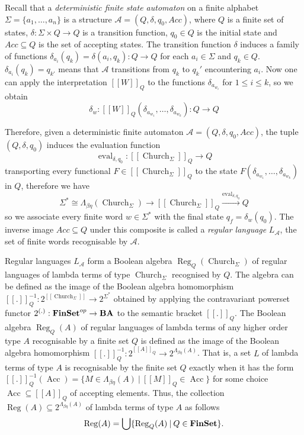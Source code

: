 \documentclass[8pt]{article}
\theoremstyle{definition}
\theoremstyle{definition}
\theoremstyle{definition}
\theoremstyle{definition}
\theoremstyle{definition}
\theoremstyle{definition}
\theoremstyle{definition}
\theoremstyle{definition}
\theoremstyle{definition}
\theoremstyle{definition}
\theoremstyle{definition}
\theoremstyle{definition}
\theoremstyle{definition}
\theoremstyle{definition}
\theoremstyle{question}
\begin{document}
Recall that a \emph{deterministic finite state automaton} on a finite alphabet $\Sigma = \{ a_1, \ldots, a_n \}$
is a structure $\mathcal{A} = (Q, \delta, q_0, Acc)$, where $Q$ is a finite set of states,
$\delta : \Sigma \times Q \to Q$ is a transition function, $q_0 \in Q$ is the initial state and
$Acc \subseteq Q$ is the set of accepting states. The transition function $\delta$ induces a family
of functions $\delta_{a_i}(q_k) = \delta(a_i, q_k) : Q \to Q$ for each $a_i \in \Sigma$ and $q_k \in Q$.
$\delta_{a_i}(q_k) = q_{k'}$ means that $\mathcal{A}$ transitions from $q_k$ to $q_k'$ encountering $a_i$.
Now one can apply the interpretation $[\![W]\!]_Q$ to the functions $\delta_{a_{w_i}}$ for $1 \leq i \leq k$,
so we obtain
\[
\delta_w : [\![W]\!]_Q (\delta_{a_{w_1}}, \ldots, \delta_{a_{w_k}}) : Q \to Q
\]

Therefore, given a deterministic finite automaton $\mathcal{A} = (Q, \delta, q_0, Acc)$,
the tuple $(Q, \delta, q_0)$ induces the evaluation function
\[
\operatorname{eval}_{\delta, q_0} : [\![\operatorname{Church}_{\Sigma}]\!]_Q \to Q
\]
transporting every functional $F \in [\![\operatorname{Church}_{\Sigma}]\!]_Q$ to the state
$F(\delta_{a_{w_1}}, \ldots, \delta_{a_{w_k}})$ in $Q$, therefore we have
\[
\Sigma^{*} \cong \Lambda_{\beta\eta}(\operatorname{Church}_{\Sigma}) \to [\![\operatorname{Church}_{\Sigma}]\!]_Q \xrightarrow{\operatorname{eval}_{\delta, q_0}} Q
\]
so we associate every finite word $w \in \Sigma^*$ with the final state $q_f = \delta_w (q_0)$.
The inverse image $Acc \subseteq Q$ under this composite is called a \emph{regular language} $L_{\mathcal{A}}$, the
set of finite words recognisable by $\mathcal{A}$.

Regular languages $L_{\mathcal{A}}$ form a Boolean algebra 
$\operatorname{Reg}_Q(\operatorname{Church}_{\Sigma})$ of regular languages of lambda terms
of type $\operatorname{Church}_{\Sigma}$ recognised by $Q$. The algebra can be defined as the image 
of the Boolean algebra homomorphism 
$[\![.]\!]^{-1}_Q : 2^{[\![\operatorname{Church}_{\Sigma}]\!]} \to 2^{\Sigma^*}$ obtained by applying
the contravariant powerset functor $2^{(.)} : {\bf FinSet}^{op} \to {\bf BA}$ to 
the semantic bracket $[\![.]\!]_Q$. The Boolean algebra $\operatorname{Reg}_Q(A)$ of regular languages of
lambda terms of any higher order type $A$ recognisable by a finite set $Q$ is defined as the image
of the Boolean algebra homomorphism $[\![.]\!]^{-1}_Q : 2^{[\![A]\!]_Q} \to 2^{\Lambda_{\beta \eta}(A)}$.
That is, a set $L$ of lambda terms of type $A$ is recognisable by the finite set $Q$ exactly when it has
the form $[\![.]\!]^{-1}_Q(\operatorname{Acc}) = \{ M \in \Lambda_{\beta\eta}(A) \: | \: [\![M]\!]_Q \in \operatorname{Acc} \}$
for some choice $\operatorname{Acc} \subseteq [\![A]\!]_Q$ of accepting elements. Thus, the collection
$\operatorname{Reg}(A) \subseteq 2^{\Lambda_{\beta \eta}(A)}$ of lambda terms of type $A$ as follows
\[
\operatorname{Reg}(A) = \bigcup \{ \operatorname{Reg}_Q(A) \: | \: Q \in {\bf FinSet} \}.
\]
\end{document}
